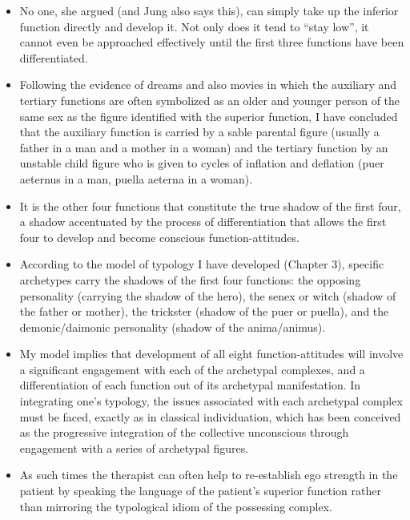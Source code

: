 \begin{itemize}

\item No one, she argued (and Jung also says this), can simply take up the
inferior function directly and develop it. Not only does it tend to ``stay
low'', it cannot even be approached effectively until the first three functions
have been differentiated.

\item Following the evidence of dreams and also movies in which the auxiliary
and tertiary functions are often symbolized as an older and younger person of
the same sex as the figure identified with the superior function, I have
concluded that the auxiliary function is carried by a sable parental figure
(usually a father in a man and a mother in a woman) and the tertiary function
by an unstable child figure who is given to cycles of inflation and deflation
(puer aeternus in a man, puella aeterna in a woman).

\item It is the other four functions that constitute the true shadow of the
first four, a shadow accentuated by the process of differentiation that allows
the first four to develop and become conscious function-attitudes.

\item According to the model of typology I have developed (Chapter 3), specific
archetypes carry the shadows of the first four functions: the opposing
personality (carrying the shadow of the hero), the senex or witch (shadow of
the father or mother), the trickster (shadow of the puer or puella), and the
demonic/daimonic personality (shadow of the anima/animus).

\item My model implies that development of all eight function-attitudes will
involve a significant engagement with each of the archetypal complexes, and a
differentiation of each function out of its archetypal manifestation. In
integrating one's typology, the issues associated with each archetypal complex
must be faced, exactly as in classical individuation, which has been conceived
as the progressive integration of the collective unconscious through engagement
with a series of archetypal figures.

\item As such times the therapist can often help to re-establish ego strength
in the patient by speaking the language of the patient's superior function
rather than mirroring the typological idiom of the possessing complex.


\end{itemize}
